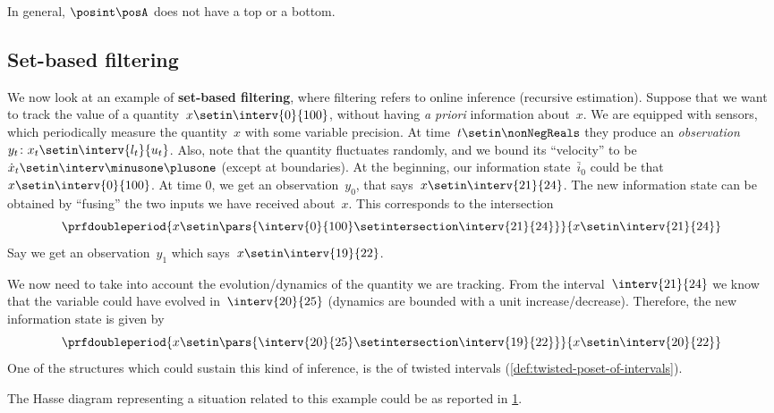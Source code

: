 In general, $\posint\posA$ does not have a top or a bottom.

\vfill
\clearpage

\subsection{Set-based filtering}
We now look at an example of \textbf{set-based filtering}, where filtering refers to online inference (recursive estimation).
Suppose that we want to track the value of a quantity~$x\setin \interv{0}{100}$, without having \emph{a priori} information about~$x$.
We are equipped with sensors, which periodically measure the quantity~$x$ with some variable precision.
At time~$t\setin \nonNegReals$ they produce an \emph{observation}~$y_t\colon x_t\setin \interv{l_t}{u_t}$.
Also, note that the quantity fluctuates randomly, and we bound its ``velocity'' to be~$\dot{x}_t\setin \interv\minusone\plusone$ (except at boundaries).
At the beginning, our information state~$\bar{i}_0$ could be that~$x\setin \interv{0}{100}$.
At time 0, we get an observation~$y_0$, that says~$x\setin \interv{21}{24}$.
The new information state can be obtained by ``fusing'' the two inputs we have received about~$x$.
This corresponds to the intersection
\begin{equation}\label{eq:filtering-2}
    \prfdoubleperiod{
        x\setin \pars{ \interv{0}{100} \setintersection \interv{21}{24}}
    }{
        x\setin \interv{21}{24}
    }
\end{equation}
Say we get an observation~$y_1$ which says~$x\setin \interv{19}{22}$.
\begin{figure}
    \centering
    \caption{}
    \label{fig:hasse_filtering}
\end{figure}
We now need to take into account the evolution/dynamics of the quantity we are tracking.
From the interval~$\interv{21}{24}$ we know that the variable could have evolved in~$\interv{20}{25}$ (dynamics are bounded with a unit increase/decrease).
Therefore, the new information state is given by
\begin{equation}\label{eq:filtering-3}
    \prfdoubleperiod{
        x\setin \pars{ \interv{20}{25} \setintersection \interv{19}{22}}
    }{
        x\setin \interv{20}{22}
    }
\end{equation}
One of the structures which could sustain this kind of inference, is the  of twisted intervals (\cref{def:twisted-poset-of-intervals}).

The Hasse diagram representing a situation related to this example could be as reported in \cref{fig:hasse_filtering}.

